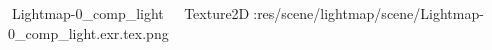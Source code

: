    Lightmap-0_comp_light            	   Texture2D   :   res/scene/lightmap/scene/Lightmap-0_comp_light.exr.tex.png